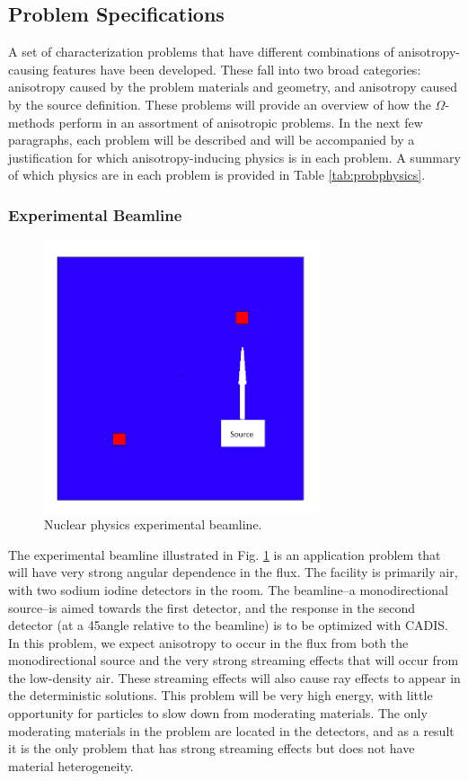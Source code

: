 \subsection{Problem Specifications}
\label{subsec:ProbSpecs}

A set of characterization problems that have
different combinations of anisotropy-causing features have been developed.  These fall
into two broad categories: anisotropy caused by the problem materials and
geometry, and anisotropy caused by the source definition. 
These problems will provide
an overview of how the $\Omega$-methods perform in an assortment of anisotropic
problems. 
In the next few
paragraphs, each problem will be described and will be accompanied by
a justification for which
anisotropy-inducing physics is in each problem. A summary of which physics are
in each problem is provided in Table \ref{tab:probphysics}.

\subsubsection*{Experimental Beamline}
\begin{figure}[h!]
  \centering
  \includegraphics[height=8cm]{./chapters/characterization_probs/figures/geometries/beam.png}
  \caption[Nuclear physics experimental beamline.]{Nuclear physics experimental beamline.}
  \label{fig:beamgeom}
\end{figure}

The experimental beamline illustrated in Fig. \ref{fig:beamgeom} is an
application problem that will have very strong angular dependence in the flux. The
facility is primarily air, with two sodium iodine detectors in the room. The
beamline--a monodirectional source--is aimed towards the first detector, and
the response in the second detector (at a 45\degree angle
relative to the beamline) is to be optimized with CADIS. In this problem, we
expect anisotropy to occur in the flux from both the monodirectional source and
the very strong streaming effects that will occur from the low-density air.
These streaming effects will also cause ray effects to appear in the
deterministic solutions. This
problem will be very high energy, with little opportunity for particles to
slow down from moderating materials. The only moderating materials in the
problem are located in the detectors, and as a result it is the only problem
that has strong streaming effects but does not have material heterogeneity.

